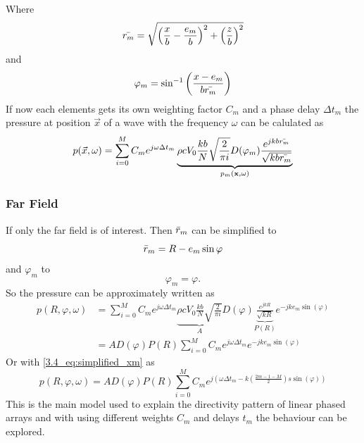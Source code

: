 Where
\begin{equation}
    \Bar{r_m} 
    = 
    \sqrt{\left ( \frac{x}{b} - \frac{e_m}{b}\right )^2 + \left ( \frac{z}{b} \right )^2}
\end{equation}
and 
\begin{equation}
    \varphi_m = \sin^{-1}{\left ( \frac{x - e_m}{b \Bar{r_m}} \right )}
\end{equation}
If now each elements gets its own weighting factor $C_m$ and a phase delay $\Delta t_m$ the pressure at position $\Vec{x}$ of a wave with the frequency $\omega$ can be calulated as 
\begin{equation}
    p(\Vec{x},\omega) 
    = 
    \sum_{i=0}^M C_m e^{j\omega \Delta t_m} \underbrace{\rho c V_0 \frac{k b}{N} \sqrt{\frac{2}{\pi i}} D(\varphi_{m}) \frac{e^{j k b \Bar{r_m}}}{\sqrt{k b \Bar{r_m}}}}_{ p_m(\textbf{x},\omega)} 
\end{equation}
\subsubsection{Far Field}
If only the far field is of interest. Then $\Bar{r}_{m}$ can be simplified to
\begin{equation}
    \Bar{r}_{m} = R - e_m \sin{\varphi}
\end{equation}
and $\varphi_m$ to
\begin{equation}
    \varphi_m = \varphi.
\end{equation}
So the pressure can be approximately written as
\begin{align}
    p(R,\varphi,\omega) 
    &= 
    \sum_{i=0}^M C_m e^{j\omega \Delta t_m} \underbrace{\rho c V_0 \frac{k b}{N} \sqrt{\frac{2}{\pi i}}}_{A} D(\varphi) \underbrace{\frac{e^{j k R}}{\sqrt{k R}}}_{P(R)}e^{-jke_m\sin{(\varphi)}} \\
    &= 
    A D(\varphi) P(R) \sum_{i=0}^M C_m e^{j\omega \Delta t_m} e^{-jke_m\sin{(\varphi)}}
\end{align}
Or with \ref{3.4_eq:simplified_xm} as
\begin{equation}
    p(R,\varphi,\omega) 
    = 
    A D(\varphi) P(R) \sum_{i=0}^M C_m e^{j (\omega \Delta t_m -k \left ( \frac{2m -1 - M}{2} \right )s \sin{(\varphi)} )}
\end{equation}
This is the main model used to explain the directivity pattern of linear phased arrays and with using different weights $C_m$ and delays $t_m$ the behaviour can be explored.

